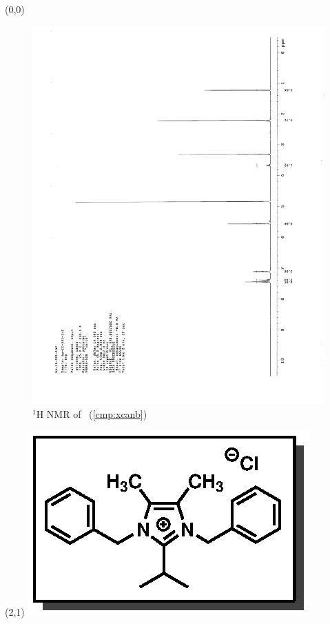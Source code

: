 \begin{textblock}{20}(0,0)
\begin{figure}[htb]
\caption{$^1$H NMR of \CMPxcanb\ (\ref{cmp:xcanb})}
\includegraphics[scale=0.75, trim = 0mm 0mm 0mm 5mm,
clip]{chp_alkylation/images/nmr/xcanbH}
\vspace{-100pt}
\end{figure}
\end{textblock}
\begin{textblock}{1}(2,1)
\includegraphics[scale=0.8, angle=90]{chp_alkylation/images/xcanb}
\end{textblock}
